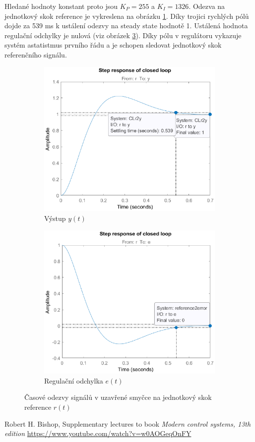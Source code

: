 \documentclass[twoside]{article}
\begin{document}
Hledané hodnoty konstant proto jsou $K_P = 255$ a $K_I = 1326$. Odezva na jednotkový skok reference je vykreslena na obrázku \ref{fig:step}.
Díky trojici rychlých pólů dojde za 539 ms k ustálení odezvy na steady state hodnotě 1. Ustálená hodnota regulační odchylky je nulová (viz obrázek \ref{fig:step_error}). 
Díky pólu v regulátoru vykazuje systém astatistmus prvního řádu a je schopen sledovat jednotkový skok referenčního signálu.

\begin{figure}[htbp]
	\centering
	\begin{subfigure}{0.45\textwidth}
		\includegraphics[width=\linewidth]{step_response.eps}
		\caption{Výstup $y(t)$}
		\label{fig:step}
	\end{subfigure}
	\begin{subfigure}{0.45\textwidth}
		\includegraphics[width=\linewidth]{step_response_error.eps}
		\caption{Regulační odchylka $e(t)$}
		\label{fig:step_error}
	\end{subfigure}
	\caption{Časové odezvy signálů v uzavřené smyčce na jednotkový skok reference $r(t)$}
\end{figure}

\begin{thebibliography}{9}

	Robert H. Bishop, Supplementary lectures to book \emph{Modern control systems, 13th edition} \url{https://www.youtube.com/watch?v=w0AOGeqOnFY}

\end{thebibliography}
\end{document}

